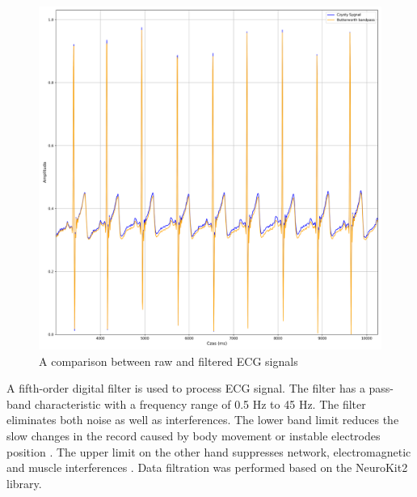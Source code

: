 \documentclass[journal]{IEEEtran}
\begin{document}
\begin{figure}[htbp]
    \centering
    \includegraphics[width=0.76\linewidth]{Filtr_EKG.png} 
    \caption{A comparison between raw and filtered ECG signals}
    \label{fig:filtr_ekg}
\end{figure}

A fifth-order digital filter is used to process ECG signal. The filter has a pass-band characteristic with a frequency range of 0.5 Hz to 45 Hz. The filter eliminates both noise as well as interferences. The lower band limit reduces the slow changes in the record caused by body movement or instable electrodes position \cite{24}. The upper limit on the other hand suppresses network, electromagnetic and muscle interferences \cite{25}. Data filtration was performed based on the NeuroKit2 library.
\end{document}
